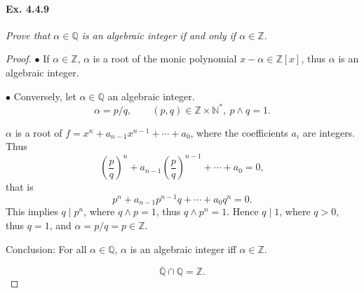 \documentclass[11pt,a4paper]{article}
\newcommand{\Q}{\mathbb{Q}}
\newcommand{\Z}{\mathbb{Z}}
\newcommand{\N}{\mathbb{N}}
\begin{document}
\paragraph{Ex. 4.4.9}

{\it Prove that $\alpha \in \Q$ is an algebraic integer if and only if $\alpha \in \Z$.
}

\begin{proof}
$\bullet$ If $\alpha \in \Z$, $\alpha$ is a root of  the monic polynomial $x-\alpha \in \Z[x]$, thus  $\alpha$ is an algebraic integer.

$\bullet$ Conversely, let $\alpha \in \Q$ an algebraic integer.
$$\alpha = p/q, \qquad(p,q) \in \Z\times \N^*, \ p\wedge q = 1.$$
 
 $\alpha$ is a root of $f = x^n+a_{n-1}x^{n-1}+\cdots+a_0$, where the coefficients $a_i$ are integers. Thus
 $$\left(\frac{p}{q}\right)^n+ a_{n-1} \left(\frac{p}{q}\right)^{n-1} + \cdots+a_0 = 0,$$
that is
 $$p^n +a_{n-1} p^{n-1}q +\cdots+a_0q^n = 0.$$
This implies $q \mid p^n$, where $q\wedge p = 1$, thus $q \wedge p^n=1$. Hence $q\mid 1$, where $q>0$, thus $q=1$, and $\alpha = p/q = p \in \Z$.
 
 Conclusion: For all $\alpha \in \Q$, $\alpha$ is an algebraic integer iff $\alpha \in \Z$.
 
 $$\overline{\Q} \cap \Q = \Z.$$
\end{proof}
\end{document}

